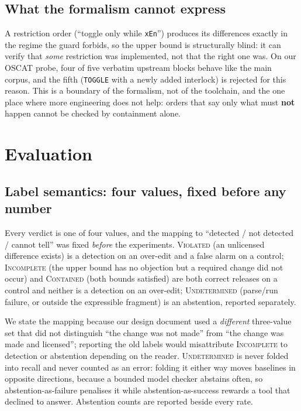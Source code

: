\documentclass[acmsmall,screen,review,anonymous]{acmart}
\begin{document}
\subsection{What the formalism cannot express}

A restriction order (``toggle only while \texttt{xEn}'') produces its differences exactly in the regime the guard forbids, so the upper bound is structurally blind: it can verify that \emph{some} restriction was implemented, not that the right one was. On our OSCAT probe, four of five verbatim upstream blocks behave like the main corpus, and the fifth (\texttt{TOGGLE} with a newly added interlock) is rejected for this reason. This is a boundary of the formalism, not of the toolchain, and the one place where more engineering does not help: orders that say only what must \textbf{not} happen cannot be checked by containment alone.

\section{Evaluation}
\label{sec:eval}

\subsection{Label semantics: four values, fixed before any number}

Every verdict is one of four values, and the mapping to ``detected / not detected / cannot tell'' was fixed \emph{before} the experiments. \textsc{Violated} (an unlicensed difference exists) is a detection on an over-edit and a false alarm on a control; \textsc{Incomplete} (the upper bound has no objection but a required change did not occur) and \textsc{Contained} (both bounds satisfied) are both correct releases on a control and neither is a detection on an over-edit; \textsc{Undetermined} (parse/run failure, or outside the expressible fragment) is an abstention, reported separately.

We state the mapping because our design document used a \emph{different} three-value set that did not distinguish ``the change was not made'' from ``the change was made and licensed''; reporting the old labels would misattribute \textsc{Incomplete} to detection or abstention depending on the reader. \textsc{Undetermined} is never folded into recall and never counted as an error: folding it either way moves baselines in opposite directions, because a bounded model checker abstains often, so abstention-as-failure penalises it while abstention-as-success rewards a tool that declined to answer. Abstention counts are reported beside every rate.
\end{document}
